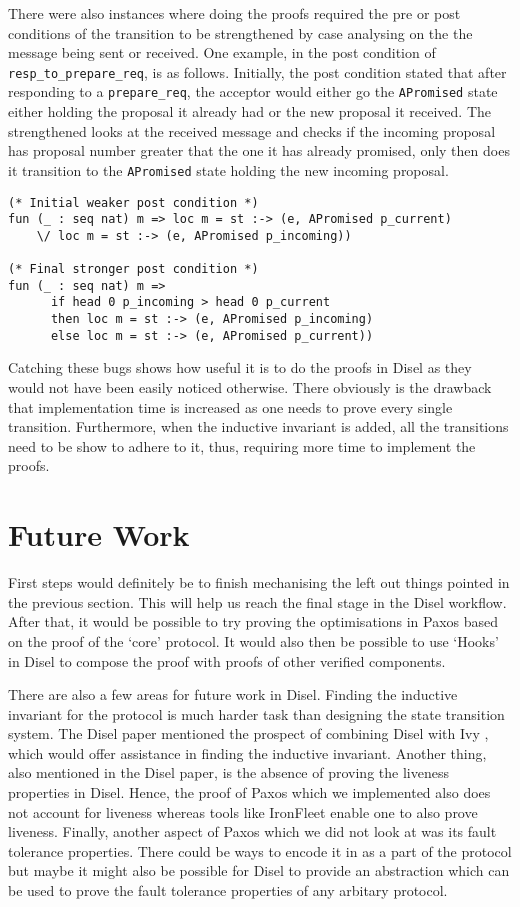 There were also instances where doing the proofs required the pre
or post conditions of the transition to
be strengthened by case analysing on the the message being sent or received.
One example, in the post condition of \texttt{resp\_to\_prepare\_req}, is as follows. Initially,
the post condition stated that after responding to a \texttt{prepare\_req},
the acceptor would either go the \texttt{APromised} state either holding the
proposal it already had or the new proposal it received. The strengthened
looks at the received message and checks if the incoming proposal has proposal
number greater that the one it has already promised, only then does it transition
to the \texttt{APromised} state holding the new incoming proposal.

\begin{lstlisting}
(* Initial weaker post condition *)
fun (_ : seq nat) m => loc m = st :-> (e, APromised p_current)
    \/ loc m = st :-> (e, APromised p_incoming))

(* Final stronger post condition *)
fun (_ : seq nat) m =>
      if head 0 p_incoming > head 0 p_current
      then loc m = st :-> (e, APromised p_incoming)
      else loc m = st :-> (e, APromised p_current))
\end{lstlisting}

Catching these bugs shows how useful it is to do the proofs in Disel as they
would not have been easily noticed otherwise.
There obviously is the drawback that implementation time is increased as one
needs to prove every single transition. Furthermore, when the inductive
invariant is added, all the transitions need to be show to adhere to it,
thus, requiring more time to implement the proofs.


\section{Future Work}
First steps would definitely be to finish mechanising the left out things
pointed in the previous section. This will help us reach the final stage in the Disel
workflow. After that, it would be possible to try proving the optimisations
in Paxos based on the proof of the `core' protocol. It would also then be possible
to use `Hooks' \cite{9} in Disel to compose the proof with proofs of other
verified components.

There are also a few areas for future work in Disel.
Finding the inductive invariant for the protocol is much harder task than
designing the state transition system. The Disel paper \cite{9} mentioned the prospect
of combining Disel with Ivy \cite{19}, which would offer assistance in finding
the inductive invariant. Another thing, also mentioned in the Disel paper, is
the absence of proving the liveness properties in Disel. Hence, the proof of
Paxos which we implemented also does not account for liveness whereas tools like
IronFleet \cite{15} enable one to also prove liveness.
Finally, another aspect of Paxos which we did not look at was its fault
tolerance properties. There could be ways to encode it in as a part of the
protocol but maybe it might also be possible for Disel to provide an
abstraction which can be used to prove the fault tolerance properties of
any arbitary protocol.
